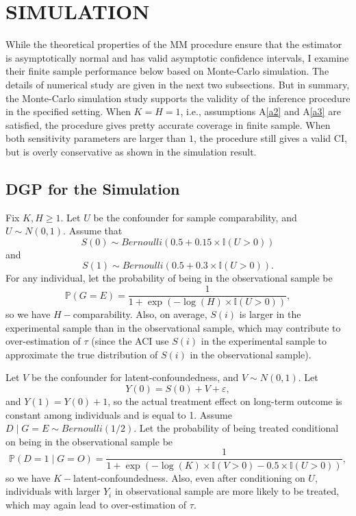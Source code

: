 \documentclass[12pt]{article}
\begin{document}
	
	\section{SIMULATION}
	
	While the theoretical properties of the MM procedure ensure that the estimator is asymptotically normal and has valid asymptotic confidence intervals, I examine their finite sample performance below based on Monte-Carlo simulation. The details of numerical study are given in the next two subsections. But in summary, the Monte-Carlo simulation study supports the validity of the inference procedure in the specified setting. When $K = H = 1$, i.e., assumptions A\ref{a2} and A\ref{a3} are satisfied, the procedure gives pretty accurate coverage in finite sample. When both sensitivity parameters are larger than $1$, the procedure still gives a valid CI, but is overly conservative as shown in the simulation result.

	\subsection{DGP for the Simulation}
	Fix $K,H \geq 1$. Let $U$ be the confounder for sample comparability, and $U \sim N(0,1)$. Assume that $$S(0) \sim Bernoulli(0.5 + 0.15 \times \mathbb{I}(U > 0))$$ and $$S(1) \sim Bernoulli(0.5 + 0.3 \times \mathbb{I}(U > 0)).$$
    For any individual, let the probability of being in the observational sample be $$\mathbb{P}(G = E) = \frac{1}{1 + \exp (-\log(H) \times \mathbb{I}(U > 0) )},$$ so we have $H-$comparability. Also, on average, $S(i)$ is larger in the experimental sample than in the observational sample, 
    which may contribute to over-estimation of $\tau$ (since the ACI use $S(i)$ in the experimental sample to approximate the true distribution of $S(i)$ in the observational sample). 

    Let $V$ be the confounder for latent-confoundedness, and $V \sim N(0,1)$. Let $$Y(0) = S(0) + V + \varepsilon,$$ and $Y(1) = Y(0) + 1$, so the actual treatment effect on long-term outcome is constant among individuals and is equal to 1. Assume $D \mid G = E \sim Bernoulli(1/2)$.
    Let the probability of being treated conditional on being in the observational sample be $$\mathbb{P}(D = 1 \mid G = O) = \frac{1}{1 + \exp (-\log(K) \times \mathbb{I}(V > 0) - 0.5 \times \mathbb{I}(U > 0) )},$$ so we have $K-$latent-confoundedness. 
    Also, even after conditioning on $U$, individuals with larger $Y_i$ in observational sample are more likely to be treated, 
    which may again lead to over-estimation of $\tau$.
    
\end{document}
